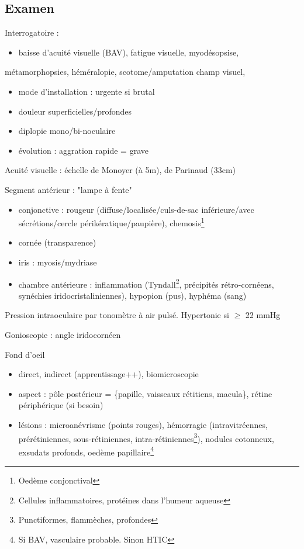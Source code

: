 \documentclass[11pt]{article}
\begin{document}
\subsection{Examen}
\label{sec:org95b0ad9}
Interrogatoire : 
\begin{itemize}
\item baisse d'acuité visuelle (BAV), fatigue visuelle, myodésopsise,
\end{itemize}
métamorphopsies, héméralopie, scotome/amputation champ visuel, 
\begin{itemize}
\item mode d'installation : urgente si brutal
\item douleur superficielles/profondes
\item diplopie mono/bi-noculaire
\item évolution : aggration rapide = grave
\end{itemize}
Acuité visuelle : échelle de Monoyer (à 5m), de Parinaud (33cm)

Segment antérieur : "lampe à fente"
\begin{itemize}
\item conjonctive : rougeur (diffuse/localisée/culs-de-sac inférieure/avec
sécrétions/cercle périkératique/paupière), chemosis\footnote{Oedème conjonctival}
\item cornée (transparence)
\item iris : myosis/mydriase
\item chambre antérieure : inflammation (Tyndall\footnote{Cellules inflammatoires, protéines dans l'humeur aqueuse}, précipités rétro-cornéens,
synéchies iridocristaliniennes), hypopion (pus), hyphéma (sang)
\end{itemize}
Pression intraoculaire par tonomètre à air pulsé. Hypertonie si \(\ge\) 22 mmHg

Gonioscopie : angle iridocornéen

Fond d'oeil
\begin{itemize}
\item direct, indirect (apprentissage++), biomicroscopie
\item aspect : pôle postérieur = \{papille, vaisseaux rétitiens, macula\}, rétine
périphérique (si besoin)
\item lésions : microanévrisme (points rouges), hémorragie (intravitréennes,
prérétiniennes, sous-rétiniennes, intra-rétiniennes\footnote{Punctiformes, flammèches, profondes}), nodules cotonneux,
exsudats profonds, oedème papillaire\footnote{Si BAV, vasculaire probable. Sinon HTIC}
\end{itemize}
\end{document}
